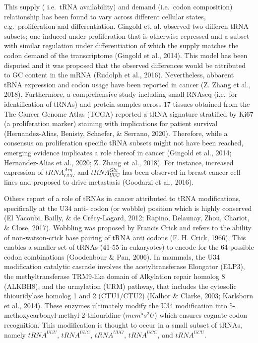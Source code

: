 \documentclass[12pt,openany]{book}
\begin{document}
This supply ( i.e.~tRNA availability) and demand (i.e.~codon
composition) relationship has been found to vary across different
cellular states, e.g.~proliferation and differentiation. Gingold et. al.
observed two differen tRNA subsets; one induced under proliferation that
is otherwise repressed and a subset with similar regulation under
differentiation of which the supply matches the codon demand of the
transcriptome (Gingold et al., 2014). This model has been disputed and
it was proposed that the observed differences would be attributed to GC
content in the mRNA (Rudolph et al., 2016). Nevertheless, abbarent tRNA
expression and codon usage have been reported in cancer (Z. Zhang et
al., 2018). Furthermore, a comprehensive study including small RNAseq
(i.e.~for identification of tRNAs) and protein samples across 17 tissues
obtained from the The Cancer Genome Atlas (TCGA) reported a tRNA
signature stratified by Ki67 (a proliferation marker) staining with
implications for patient survival (Hernandez-Alias, Benisty, Schaefer,
\& Serrano, 2020). Therefore, while a consensus on proliferation
specific tRNA subsets might not have been reached, emerging evidence
implicates a role thereof in cancer (Gingold et al., 2014;
Hernandez-Alias et al., 2020; Z. Zhang et al., 2018). For instance,
increased expression of \(tRNA_{CCG}^{Arg}\) and \(tRNA_{UUC}^{Glu}\)
has been observed in breast cancer cell lines and proposed to drive
metastasis (Goodarzi et al., 2016).

Others report of a role of tRNAs in cancer attributed to tRNA
modifications, specifically at the U34 anti- codon (or wobble) position
which is highly conserved (El Yacoubi, Bailly, \& de Crécy-Lagard, 2012;
Rapino, Delaunay, Zhou, Chariot, \& Close, 2017). Wobbling was proposed
by Francis Crick and refers to the ability of non-watson-crick base
pairing of tRNA anti codons (F. H. Crick, 1966). This enables a smaller
set of tRNAs (41-55 in eukaryotes) to encode for the 64 possible codon
combinations (Goodenbour \& Pan, 2006). In mammals, the U34 modification
catalytic cascade involves the acetyltransferase Elongator (ELP3), the
methyltransferase TRM9-like domain of Alkylation repair homolog 8
(ALKBH8), and the urmylation (URM) pathway, that includes the cytosolic
thiouridylase homolog 1 and 2 (CTU1/CTU2) (Kalhor \& Clarke, 2003;
Karlsborn et al., 2014). These enzymes ultimately modify the U34
modification into 5-methoxycarbonyl-methyl-2-thiouridine (\(mcm^5s^2U\))
which ensures cognate codon recognition. This modification is thought to
occur in a small subset of tRNAs, namely \(tRNA^{UUU}\), \(tRNA^{UUC}\),
\(tRNA^{UUG}\), \(tRNA^{UCC}\), and \(tRNA^{UCU}\).
\end{document}
